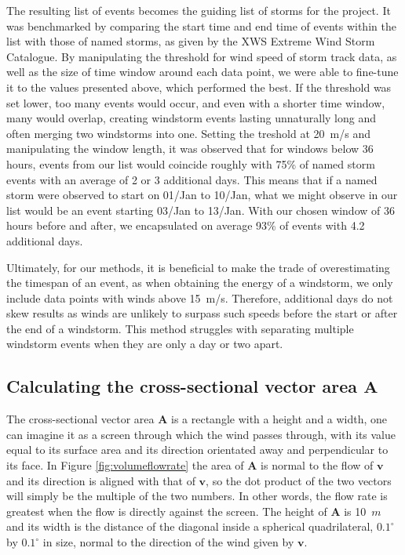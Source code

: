         The resulting list of events becomes the guiding list of storms for the project. It was benchmarked by comparing the start time and end time of events within the list with those of named storms, as given by the XWS Extreme Wind Storm Catalogue. By manipulating the threshold for wind speed of storm track data, as well as the size of time window around each data point, we were able to fine-tune it to the values presented above, which performed the best. If the threshold was set lower, too many events would occur, and even with a shorter time window, many would overlap, creating windstorm events lasting unnaturally long and often merging two windstorms into one. Setting the treshold at 20~m/s and manipulating the window length, it was observed that for windows below 36 hours, events from our list would coincide roughly with 75\% of named storm events with an average of 2 or 3 additional days. This means that if a named storm were observed to start on 01/Jan to 10/Jan, what we might observe in our list would be an event starting 03/Jan to 13/Jan. With our chosen window of 36 hours before and after, we encapsulated on average 93\% of events with 4.2 additional days.

        Ultimately, for our methods, it is beneficial to make the trade of overestimating the timespan of an event, as when obtaining the energy of a windstorm, we only include data points with winds above 15~m/s. Therefore, additional days do not skew results as winds are unlikely to surpass such speeds before the start or after the end of a windstorm. This method struggles with separating multiple windstorm events when they are only a day or two apart.
        
        
            

    \subsection{Calculating the cross-sectional vector area $\mathbf{A}$}
    \label{sec:Calculating the cross-sectional vector area}

        The cross-sectional vector area $\mathbf{A}$ is a rectangle with a height and a width, one can imagine it as a screen through which the wind passes through, with its value equal to its surface area and its direction orientated away and perpendicular to its face. In Figure \ref{fig:volumeflowrate} the area of $\mathbf{A}$ is normal to the flow of $\mathbf{v}$ and its direction is aligned with that of $\mathbf{v}$, so the dot product of the two vectors will simply be the multiple of the two numbers. In other words, the flow rate is greatest when the flow is directly against the screen. The height of $\mathbf{A}$ is 10~$m$ and its width is the distance of the diagonal inside a spherical quadrilateral, $0.1^\circ$ by $0.1^\circ$ in size, normal to the direction of the wind given by $\mathbf{v}$.


